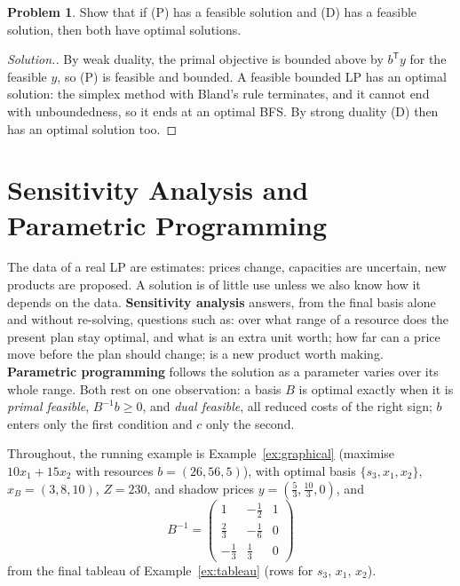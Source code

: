 \documentclass[11pt,a4paper]{article}
\numberwithin{equation}{section}
\theoremstyle{definition}
\newtheorem{problemx}{Problem}[subsection]
\newenvironment{problem}{\begin{problemx}}{\end{problemx}}
\newenvironment{solution}
  {\renewcommand{\qedsymbol}{}\begin{proof}[\textit{Solution}.]}
  {\end{proof}}
\begin{document}
\begin{problem}
Show that if (P) has a feasible solution and (D) has a feasible solution, then both have optimal solutions.
\end{problem}

\begin{solution}
By weak duality, the primal objective is bounded above by $b^{\mathsf T}y$ for the feasible $y$, so (P) is feasible and bounded. A feasible bounded LP has an optimal solution: the simplex method with Bland's rule terminates, and it cannot end with unboundedness, so it ends at an optimal BFS. By strong duality (D)
then has an optimal solution too.
\end{solution}

\section{Sensitivity Analysis and Parametric Programming}
\label{sec:sensitivity}

The data of a real LP are estimates: prices change, capacities are uncertain, new products are proposed. A solution is of little use unless we also know how it depends on the data. \textbf{Sensitivity analysis} answers, from the final basis alone and without re-solving, questions such as: over what range of a
resource does the present plan stay optimal, and what is an extra unit worth; how far can a price move before the plan should change; is a new product worth making. \textbf{Parametric programming} follows the solution as a parameter varies over its whole range. Both rest on one observation: a basis $B$
is optimal exactly when it is \emph{primal feasible}, $B^{-1}b \geq 0$, and \emph{dual feasible}, all reduced costs of the right sign; $b$ enters only the first condition and $c$ only the second.

Throughout, the running example is Example~\ref{ex:graphical} (maximise $10x_1 + 15x_2$ with resources $b = (26, 56, 5)$), with optimal basis $\{s_3, x_1, x_2\}$, $x_B = (3, 8, 10)$, $Z = 230$, and shadow prices $y = (\frac53, \frac{10}3, 0)$, and
\[
B^{-1} = \begin{pmatrix} 1 & -\frac12 & 1 \\ \frac23 & -\frac16 & 0 \\ -\frac13 & \frac13 & 0 \end{pmatrix}
\]
from the final tableau of Example~\ref{ex:tableau} (rows for $s_3$, $x_1$, $x_2$).
\end{document}
